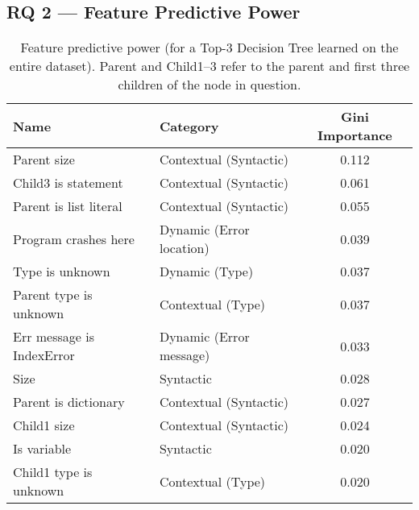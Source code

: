 \documentclass[conference]{IEEEtran}
\begin{document}
\subsection{RQ 2 --- Feature Predictive Power}

\begin{table}[]
\begin{tabular}{llc}
Name                      & Category                & Gini Importance \\ \bottomrule
Parent size                    & Contextual (Syntactic)  & 0.112 \\
Child3 is statement           & Contextual (Syntactic)  & 0.061 \\
Parent is list literal         & Contextual (Syntactic)  & 0.055 \\
Program crashes here      & Dynamic (Error location)& 0.039 \\
Type is unknown           & Dynamic (Type)          & 0.037 \\
Parent type is unknown         & Contextual (Type)       & 0.037 \\
Err message is IndexError & Dynamic (Error message) & 0.033 \\
Size                      & Syntactic               & 0.028 \\
Parent is dictionary & Contextual (Syntactic)  & 0.027 \\
Child1 size                   & Contextual (Syntactic)  & 0.024 \\
Is variable               & Syntactic               & 0.020 \\
Child1 type is unknown        & Contextual (Type)       & 0.020 \\
\toprule
\end{tabular}
\caption{Feature predictive power (for a Top-3 Decision Tree
learned on the entire dataset). Parent and Child1--3 refer to the parent and
first three children of the node in question.}
\label{tab-feature-predictive-power}
\end{table}
\end{document}
